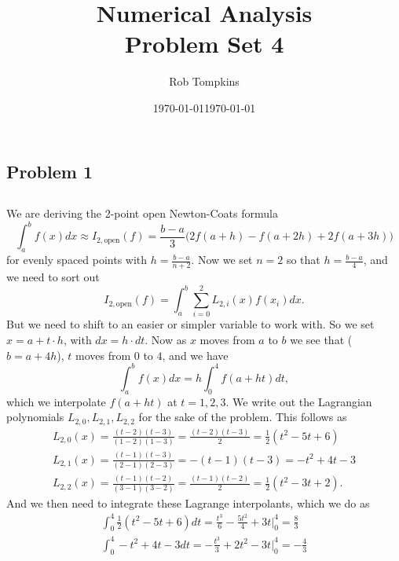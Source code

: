 \documentclass[12pt]{amsart}
\title{Numerical Analysis\\Problem Set 4}
\author{Rob Tompkins}
\date{\today}
\begin{document}
    \maketitle
    \date{\today}
    \begin{onehalfspace}
        \section{Problem 1}
        \subsection{}
        We are deriving the 2-point open Newton-Coats formula
        \[
            \int_a^b f(x)dx\approx I_{2,\text{open}}(f) = \frac{b-a}{3}\bigg(2f(a+h) - f(a+2h) + 2f(a+3h)\bigg)
        \]
        for evenly spaced points with $h = \frac{b-a}{n+2}$.
        Now we set $n = 2$ so that $h=\frac{b-a}{4}$, and we need to sort out
        \begin{equation}
            I_{2,\text{open}}(f) = \int_a^b\sum_{i=0}^2 L_{2,i}(x)f(x_i) dx.
            \label{nc-equation}
        \end{equation}
        But we need to shift to an easier or simpler variable to work with.
        So we set $x=a+t\cdot h$, with $dx=h\cdot dt$.
        Now as $x$ moves from $a$ to $b$ we see that ($b=a+4h$), $t$ moves from $0$ to $4$, and we have
        \[
            \int_a^b f(x)dx = h\int_0^4 f(a+ht)dt,
        \]
        which we interpolate $f(a+ht)$ at $t=1,2,3$.
        We write out the Lagrangian polynomials $L_{2,0}, L_{2,1}, L_{2,2}$ for the sake of the problem.
        This follows as
        \begin{gather*}
            L_{2,0}(x) = \frac{(t-2)(t-3)}{(1-2)(1-3)} = \frac{(t-2)(t-3)}{2} = \frac{1}{2}(t^2 -5t + 6)\\
            L_{2,1}(x) = \frac{(t-1)(t-3)}{(2-1)(2-3)} = -(t-1)(t-3) = -t^2+ 4t - 3\\
            L_{2,2}(x) = \frac{(t-1)(t-2)}{(3-1)(3-2)} = \frac{(t-1)(t-2)}{2} = \frac{1}{2}(t^2 - 3t + 2).
        \end{gather*}
        And we then need to integrate these Lagrange interpolants, which we do as
        \begin{gather*}
            \int_0^4 \frac{1}{2}(t^2-5t+6)dt = \frac{t^3}{6} - \frac{5t^2}{4} + 3t \bigg|_0^4 = \frac{8}{3}\\
            \int_0^4 -t^2 + 4t - 3dt = -\frac{t^3}{3} + 2t^2 - 3t \bigg|_0^4 = -\frac{4}{3}\\

\end{gather*}
\end{onehalfspace}
\end{document}
